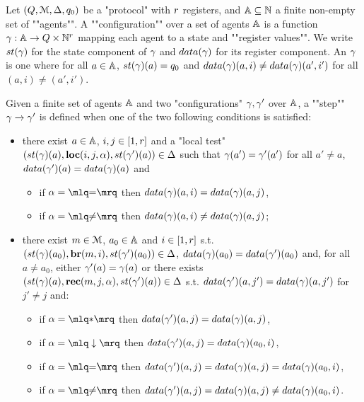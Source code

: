 \begin{definition}[Semantics]
	Let $(Q,\mathcal{M}, \Delta, q_0)$ be a "protocol" with $r$ registers, and $\mathbb{A} \subseteq \mathbb{N}$ a finite non-empty set of ""agents"".
	A ""configuration"" over a set of agents $\mathbb{A}$ is a function $\gamma : \mathbb{A} \to Q \times \mathbb{N}^{r}$ mapping each agent to a state and ""register values"". 
	We write $\st{\config}$ for the state component of $\gamma$ and $\data{\config}$ for its register component.
	An  $\gamma$ is one where for all $a \in \mathbb{A}$, $\st{\config}(a) = q_0$ and $\data{\config}(a, i) \neq \data{\config}(a', i')$ for all $(a,i) \neq (a', i')$.
	
	\AP Given a finite set of agents $\mathbb{A}$ and two "configurations" $\gamma, \gamma'$ over $\mathbb{A}$, a ""step"" $\gamma \xrightarrow{} \gamma'$ is defined when one of the two following conditions is satisfied:
	\begin{itemize}
		\item there exist $a \in \mathbb{A}$, $i,j \in [1,r]$ and a "local test" $(\st{\config}(a), \loc{i}{j}{\anact}, \st{\config'}(a)) \in \transitions$ such that $\gamma(a') = \gamma'(a')$ for all $a'\neq a$, $\data{\config'}(a) = \data{\config}(a)$ and
		\begin{itemize}
			\item if $\anact = \quotemarks{\eqtestact}$ then $\data{\config}(a,i) = \data{\config}(a,j)$,
			
			\item if $\anact = \quotemarks{\diseqtestact}$ then $\data{\config}(a,i) \neq \data{\config}(a,j)$;
		\end{itemize}
		
		\item there exist $m \in \mathcal{M}$, $a_0 \in \mathbb{A}$ and $i \in [1,r]$ s.t. $(\st{\config}(a_0),\br{\amessage}{i}, \st{\config'}(a_0)) \in \transitions$, $\data{\config}(a_0) = \data{\config'}(a_0)$ and, for all $a \ne a_0$, either $\gamma'(a) = \gamma(a)$ or there exists $(\st{\config}(a),\rec{m}{j}{\anact},\st{\config'}(a)) \in \transitions$
		s.t. $\data{\config'}(a, j') = \data{\config}(a, j')$ for $j' \neq j$ and:
		\begin{itemize}
				\item if $\anact = \quotemarks{\dummyact}$ 
				then $\data{\config'}(a,j) = \data{\config}(a,j)$,
				\item if $\anact = \quotemarks{\enregact}$ then $\data{\config'}(a,j) = \data{\config}(a_0,i)$,
				\item if $\anact = \quotemarks{\eqtestact}$ then $\data{\config'}(a,j) = \data{\config}(a,j) =\data{\config}(a_0,i)$,
				\item if $\anact = \quotemarks{\diseqtestact}$ then $\data{\config'}(a,j) = \data{\config}(a,j) \ne \data{\config}(a_0,i)$.
			\end{itemize}
		\end{itemize}
	

\end{definition}
